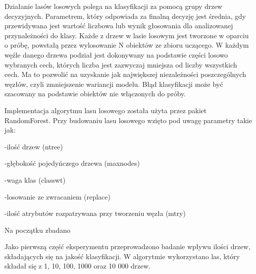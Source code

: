Działanie lasów losowych polega na klasyfikacji za pomocą grupy drzew decyzyjnych. Parametrem, który odpowiada za finalną decyzję jest średnia, gdy przewidywana jest wartość liczbowa lub wynik głosowania dla analizowanej przynależności do klasy. Każde z drzew w lasie losowym jest tworzone w oparciu o próbę, powstałą przez wylosowanie N obiektów ze zbioru uczącego. W każdym węźle danego drzewa podział jest dokonywany na podstawie części losowo wybranych cech, których liczba jest zazwyczaj mniejsza od liczby wszystkich cech. Ma to pozwolić na uzyskanie jak największej niezależności poszczególnych węzłów, czyli zmniejszenie wariancji modelu.
Błąd klasyfikacji może być szacowany na podstawie obiektów nie włączonych do próby.

Implementacja algorytmu lasu losowego została użyta przez pakiet RandomForest. Przy budowaniu lasu losowego wzięto pod uwagę parametry takie jak:

-ilość drzew (ntree)

-głębokość pojedyńczego drzewa (maxnodes)

-waga klas (classwt)

-losowanie ze zwracaniem (replace)

-ilość atrybutów rozpatrywana przy tworzeniu węzła (mtry)


Na początku zbadano 

Jako pierwszą część eksperymentu przeprowadzono badanie wpływu ilości drzew, składających się na jakość klasyfikacji. W algorytmie wykorzystano las, który składał się z 1, 10, 100, 1000 oraz 10 000 drzew.


